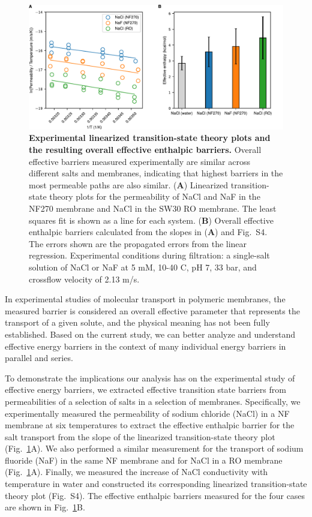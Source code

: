 \documentclass[12pt]{article}
\begin{document}
\begin{figure}[ht]
    \centering
    \includegraphics[width=\linewidth]{figures/fig7.pdf}
    \caption{\textbf{Experimental linearized transition-state theory plots and the resulting overall effective enthalpic barriers.} Overall effective barriers measured experimentally are similar across different salts and membranes, indicating that highest barriers in the most permeable paths are also similar. (\textbf{A}) Linearized transition-state theory plots for the permeability of NaCl and NaF in the NF270 membrane and NaCl in the SW30 RO membrane. The least squares fit is shown as a line for each system. (\textbf{B}) Overall effective enthalpic barriers calculated from the slopes in (\textbf{A}) and Fig.~S4. The errors shown are the propagated errors from the linear regression. Experimental conditions during filtration: a single-salt solution of NaCl or NaF at 5 mM, 10-40 \textdegree C, pH 7, 33 bar, and crossflow velocity of 2.13 m/s. }
    \label{fig:experimental_data}
\end{figure}

In experimental studies of molecular transport in polymeric membranes, the measured barrier is considered an overall effective parameter that represents the transport of a given solute, and the physical meaning has not been fully established. Based on the current study, we can better analyze and understand effective energy barriers in the context of many individual energy barriers in parallel and series.

To demonstrate the implications our analysis has on the experimental study of effective energy barriers, we extracted effective transition state barriers from permeabilities of a selection of salts in a selection of membranes.  Specifically, 
we experimentally measured the permeability of sodium chloride (NaCl) in a NF membrane at six temperatures to extract the effective enthalpic barrier for the salt transport from the slope of the linearized transition-state theory plot (Fig.~\ref{fig:experimental_data}A). We also performed a similar measurement for the transport of sodium fluoride (NaF) in the same NF membrane and for NaCl in a RO membrane (Fig.~\ref{fig:experimental_data}A). 
Finally, we measured the increase of NaCl conductivity with temperature in water and constructed its corresponding linearized transition-state theory plot (Fig.~S4). The effective enthalpic barriers measured for the four cases are shown in Fig.~\ref{fig:experimental_data}B.
\end{document}
